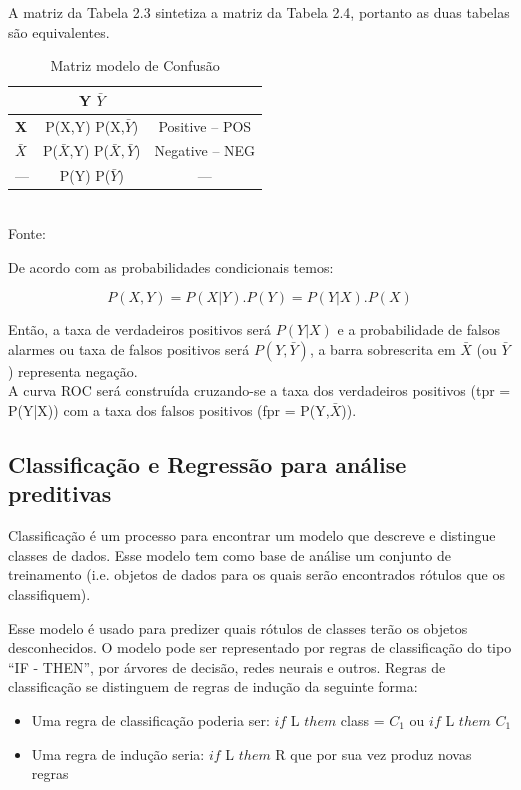 A matriz da Tabela 2.3 sintetiza a matriz da Tabela 2.4, portanto as duas tabelas são equivalentes.

\begin{table}[ht]
\centering
\caption{Matriz modelo de Confusão}
\vspace{1mm}
\begin{tabular}{l|c|c}
\hline
\textbf{}           & \textbf{Y}     \textbf{$\bar{Y}$}   & \textbf{}\\
\hline
\textbf{X}          & P(X,Y)         P(X,$\bar{Y}$)       & Positive -- POS\\
\textbf{$\bar{X}$}  & P($\bar{X}$,Y) P($\bar{X},\bar{Y}$) & Negative -- NEG\\
\hline
   ---              & P(Y)           P($\bar{Y}$)         &     ---        \\
\end{tabular}
\\
\tiny Fonte: \cite{Bradley1997}
\end{table}


De acordo com as probabilidades condicionais temos:

\begin{equation}
 P(X,Y) = P(X|Y).P(Y) = P(Y|X).P(X)
\end{equation}

Então, a taxa de verdadeiros positivos será $P(Y|X)$ e a probabilidade de falsos alarmes ou taxa de falsos positivos será $P(Y,\bar{Y})$, a barra sobrescrita em $\bar{X}$
(ou $\bar{Y}$) representa negação. \\
A curva ROC será construída cruzando-se a taxa dos verdadeiros positivos (tpr = P(Y|X)) com a taxa dos falsos positivos (fpr = P(Y,$\bar{X}$)).


\subsection{Classificação e Regressão para análise preditivas}

Classificação é um processo para encontrar um modelo que descreve e distingue classes de dados. 
Esse modelo tem como base de análise um conjunto de treinamento (i.e. objetos de dados para os quais 
serão encontrados rótulos que os classifiquem). 

Esse modelo é usado para predizer quais rótulos de classes terão os objetos desconhecidos.
O modelo pode ser representado por regras de classificação do tipo ``IF - THEN'', por árvores de decisão, redes neurais e outros. 
Regras de classificação se distinguem de regras de indução da seguinte forma:
\begin{itemize}
	\item Uma regra de classificação poderia ser: $if$ L $them$ class = $C_{1}$ ou $if$ L $them$  $C_{1}$
	\item Uma regra de indução seria: $ if$ L $them$ R que por sua vez produz novas regras 
\end{itemize}

